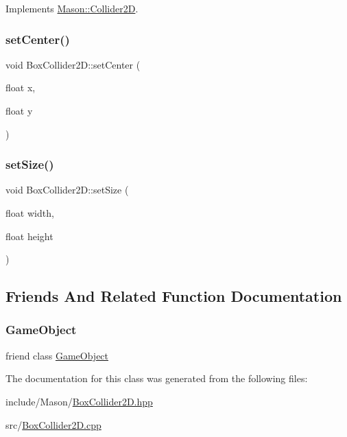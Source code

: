 Implements \hyperlink{class_mason_1_1_collider2_d_a3394739f1fea805691ac2753a9272156}{Mason\+::\+Collider2D}.

\hypertarget{class_mason_1_1_box_collider2_d_aa2c5bb9d3f7e0c64f8784dce237676b4}{}\label{class_mason_1_1_box_collider2_d_aa2c5bb9d3f7e0c64f8784dce237676b4} 
\subsubsection{\texorpdfstring{set\+Center()}{setCenter()}}
{\footnotesize\ttfamily void Box\+Collider2\+D\+::set\+Center (\begin{DoxyParamCaption}\item[{float}]{x,  }\item[{float}]{y }\end{DoxyParamCaption})}

\hypertarget{class_mason_1_1_box_collider2_d_af6ee6df0351c4a59b344a274626b032d}{}\label{class_mason_1_1_box_collider2_d_af6ee6df0351c4a59b344a274626b032d} 
\subsubsection{\texorpdfstring{set\+Size()}{setSize()}}
{\footnotesize\ttfamily void Box\+Collider2\+D\+::set\+Size (\begin{DoxyParamCaption}\item[{float}]{width,  }\item[{float}]{height }\end{DoxyParamCaption})}



\subsection{Friends And Related Function Documentation}
\hypertarget{class_mason_1_1_box_collider2_d_a00df87c957d8f7ee0fc51f07a0542f4a}{}\label{class_mason_1_1_box_collider2_d_a00df87c957d8f7ee0fc51f07a0542f4a} 
\subsubsection{\texorpdfstring{Game\+Object}{GameObject}}
{\footnotesize\ttfamily friend class \hyperlink{class_mason_1_1_game_object}{Game\+Object}\hspace{0.3cm}{\ttfamily [friend]}}



The documentation for this class was generated from the following files\+:\begin{DoxyCompactItemize}
\item 
include/\+Mason/\hyperlink{_box_collider2_d_8hpp}{Box\+Collider2\+D.\+hpp}\item 
src/\hyperlink{_box_collider2_d_8cpp}{Box\+Collider2\+D.\+cpp}\end{DoxyCompactItemize}
